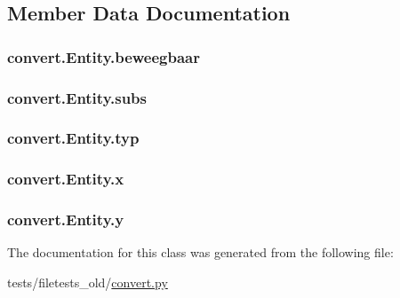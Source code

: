 \subsection{Member Data Documentation}
\hypertarget{classconvert_1_1_entity_a78936a04ea3735de546ffa877b2ad02d}{
\subsubsection[{beweegbaar}]{\setlength{\rightskip}{0pt plus 5cm}convert.\-Entity.\-beweegbaar}}\label{classconvert_1_1_entity_a78936a04ea3735de546ffa877b2ad02d}
\hypertarget{classconvert_1_1_entity_a0c8f63ae0353069137abe9a8e4c9b112}{
\subsubsection[{subs}]{\setlength{\rightskip}{0pt plus 5cm}convert.\-Entity.\-subs}}\label{classconvert_1_1_entity_a0c8f63ae0353069137abe9a8e4c9b112}
\hypertarget{classconvert_1_1_entity_a050e99f5fa3fa332ec1890b0c7ce165f}{
\subsubsection[{typ}]{\setlength{\rightskip}{0pt plus 5cm}convert.\-Entity.\-typ}}\label{classconvert_1_1_entity_a050e99f5fa3fa332ec1890b0c7ce165f}
\hypertarget{classconvert_1_1_entity_a80eb3f8a523f2f82bce7714aa64dd4e9}{
\subsubsection[{x}]{\setlength{\rightskip}{0pt plus 5cm}convert.\-Entity.\-x}}\label{classconvert_1_1_entity_a80eb3f8a523f2f82bce7714aa64dd4e9}
\hypertarget{classconvert_1_1_entity_adce59aac5a6f84b4eed9afc72737e11e}{
\subsubsection[{y}]{\setlength{\rightskip}{0pt plus 5cm}convert.\-Entity.\-y}}\label{classconvert_1_1_entity_adce59aac5a6f84b4eed9afc72737e11e}


The documentation for this class was generated from the following file\-:\begin{DoxyCompactItemize}
\item 
tests/filetests\-\_\-old/\hyperlink{convert_8py}{convert.\-py}\end{DoxyCompactItemize}

